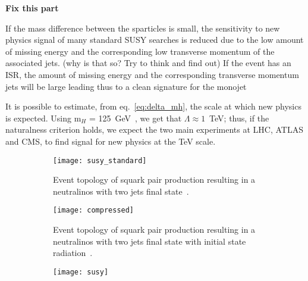 \mbox{}

\noindent \textbf{Fix this part}

If the mass difference between the sparticles is small, the sensitivity to new
physics signal of many standard SUSY searches is reduced due to the low amount
of missing energy and the corresponding low transverse momentum of the
associated jets. (why is that so? Try to think and find out) If the event has an
ISR, the amount of missing energy and the corresponding transverse momentum jets
will be large leading thus to a clean signature for the monojet

\mbox{}

It is possible to estimate, from eq.~\cref{eq:delta_mh}, the scale at which new
physics is expected. Using m$_H$ = 125~GeV~\cite{PDG}, we get that
$\Lambda \approx 1$~TeV; thus, if the naturalness criterion holds, we expect the
two main experiments at LHC, ATLAS and CMS, to find signal for new physics at
the TeV scale.

\begin{figure}[!h]
  \centering
  \begin{subfigure}[t]{.48\linewidth}
    \texttt{[image: susy\_standard]}
    \caption{Event topology of squark pair production resulting in a neutralinos
      with two jets final state~\cite{SUSYPub}.}
    \label{fig:susy_standard}
  \end{subfigure} \quad
  \begin{subfigure}[t]{.48\linewidth}
    \texttt{[image: compressed]}
    \caption{Event topology of squark pair production resulting in a neutralinos
      with two jets final state with initial state radiation~\cite{ExotPub}.}
    \label{fig:susy_compressed}
  \end{subfigure}
  \begin{subfigure}[t]{.7\linewidth}
    \texttt{[image: susy]}
    \caption{}
    \label{fig:susy_exclusion}
  \end{subfigure}
  \caption{}
  \label{fig:motivation}
\end{figure}

